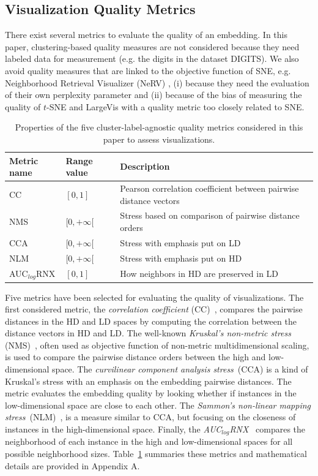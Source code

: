 \subsection{Visualization Quality Metrics}\label{subsec:qual_metrics_background}

There exist several metrics to evaluate the quality of an embedding.  
In this paper, clustering-based quality measures are not considered because they need labeled data for measurement (e.g. the digits in the dataset DIGITS).
We also avoid quality measures that are linked to the objective function of SNE, e.g. Neighborhood Retrieval Visualizer (NeRV) \cite{venna2010}, (i) because they need the evaluation of their own perplexity parameter and (ii) because of the bias of measuring the quality of $t$-SNE and LargeVis with a quality metric too closely related to SNE.

\begin{table}%
\caption{Properties of the five cluster-label-agnostic quality metrics considered in this paper to assess visualizations.}\label{tab:metrics}
\begin{tabular}{p{1.5cm} p{0.8cm} p{4.5cm}}
\toprule
Metric name &  Range value & Description\\
\midrule
CC & $[0, 1]$ & Pearson correlation coefficient between pairwise distance vectors\\
NMS & $[0, +\infty[$ & Stress based on comparison of pairwise distance orders\\
CCA & $[0, +\infty[$ & Stress with emphasis put on LD\\
NLM & $[0, +\infty[$ & Stress with emphasis put on HD\\
AUC$_{log}$RNX & $[0, 1]$ & How neighbors in HD are preserved in LD\\
\bottomrule
\end{tabular}
\end{table}

Five metrics have been selected for evaluating the quality of visualizations. 
The first considered metric, the \emph{correlation coefficient} (CC)~\cite{geng2005}, compares the pairwise distances in the HD and LD spaces by computing the correlation between the distance vectors in HD and LD. The well-known \emph{Kruskal's non-metric stress} (NMS)~\cite{kruskal1964}, often used as objective function of non-metric multidimensional scaling, is used to compare the pairwise distance orders between the high and low-dimensional space. The \emph{curvilinear component analysis stress}~(CCA) \cite{demartines1997} is a kind of Kruskal's stress with an emphasis on the embedding pairwise distances. The metric evaluates the embedding quality by looking whether if instances in the low-dimensional space are close to each other. The \emph{Sammon's non-linear mapping stress}~(NLM)~\cite{sammon1969}, is a measure similar to CCA, but focusing on the closeness of instances in the high-dimensional space. Finally, the \emph{AUC$_{log}$RNX}~\cite{lee2015} compares the neighborhood of each instance in the high and low-dimensional spaces for all possible neighborhood sizes. Table~\ref{tab:metrics} summaries these metrics and mathematical details are provided in Appendix A. 

